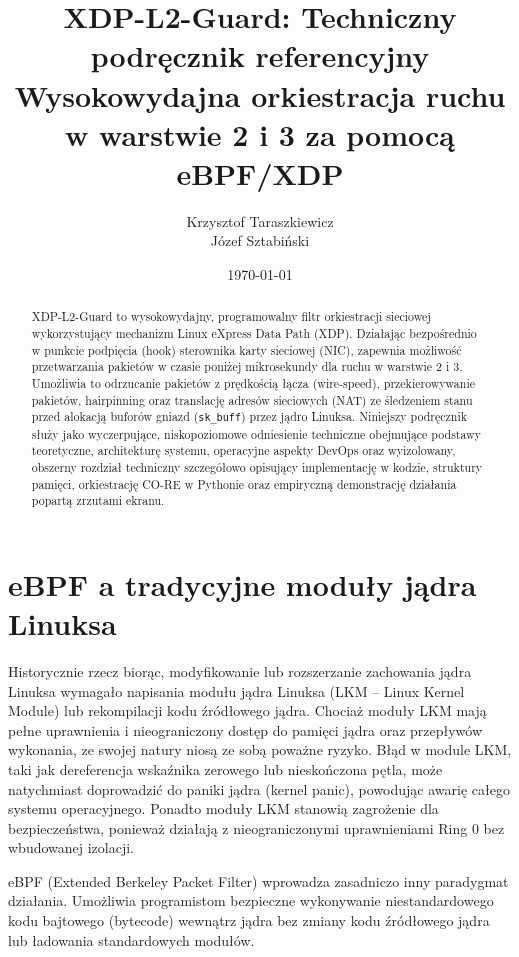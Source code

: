 \documentclass[11pt,a4paper]{article}
\title{\textbf{XDP-L2-Guard: Techniczny podręcznik referencyjny \\ \large Wysokowydajna orkiestracja ruchu w warstwie 2 i 3 za pomocą eBPF/XDP}}
\author{Krzysztof Taraszkiewicz \\ Józef Sztabiński}
\date{\today}
\begin{document}
\color{docblue} %

\maketitle

\begin{abstract}
XDP-L2-Guard to wysokowydajny, programowalny filtr orkiestracji sieciowej wykorzystujący mechanizm Linux eXpress Data Path (XDP). Działając bezpośrednio w punkcie podpięcia (hook) sterownika karty sieciowej (NIC), zapewnia możliwość przetwarzania pakietów w czasie poniżej mikrosekundy dla ruchu w warstwie 2 i 3. Umożliwia to odrzucanie pakietów z prędkością łącza (wire-speed), przekierowywanie pakietów, hairpinning oraz translację adresów sieciowych (NAT) ze śledzeniem stanu przed alokacją buforów gniazd (\texttt{sk\_buff}) przez jądro Linuksa. Niniejszy podręcznik służy jako wyczerpujące, niskopoziomowe odniesienie techniczne obejmujące podstawy teoretyczne, architekturę systemu, operacyjne aspekty DevOps oraz wyizolowany, obszerny rozdział techniczny szczegółowo opisujący implementację w kodzie, struktury pamięci, orkiestrację CO-RE w Pythonie oraz empiryczną demonstrację działania popartą zrzutami ekranu.
\end{abstract}

\tableofcontents
\vspace{1cm}

\section{eBPF a tradycyjne moduły jądra Linuksa}

Historycznie rzecz biorąc, modyfikowanie lub rozszerzanie zachowania jądra Linuksa wymagało napisania modułu jądra Linuksa (LKM – Linux Kernel Module) lub rekompilacji kodu źródłowego jądra. Chociaż moduły LKM mają pełne uprawnienia i nieograniczony dostęp do pamięci jądra oraz przepływów wykonania, ze swojej natury niosą ze sobą poważne ryzyko. Błąd w module LKM, taki jak dereferencja wskaźnika zerowego lub nieskończona pętla, może natychmiast doprowadzić do paniki jądra (kernel panic), powodując awarię całego systemu operacyjnego. Ponadto moduły LKM stanowią zagrożenie dla bezpieczeństwa, ponieważ działają z nieograniczonymi uprawnieniami Ring 0 bez wbudowanej izolacji.

eBPF (Extended Berkeley Packet Filter) wprowadza zasadniczo inny paradygmat działania. Umożliwia programistom bezpieczne wykonywanie niestandardowego kodu bajtowego (bytecode) wewnątrz jądra bez zmiany kodu źródłowego jądra lub ładowania standardowych modułów. 
\end{document}
